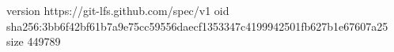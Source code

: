 version https://git-lfs.github.com/spec/v1
oid sha256:3bb6f42bf61b7a9e75cc59556daecf1353347c4199942501fb627b1e67607a25
size 449789
